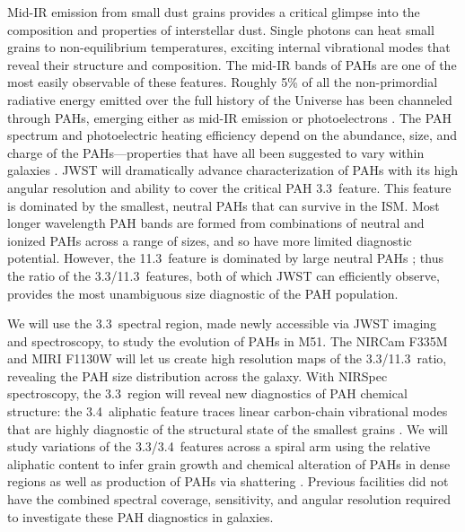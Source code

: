 \documentclass[12pt]{article}
\begin{document}
\vspace{0.2\baselineskip}
 Mid-IR emission from small dust grains provides a critical glimpse into the composition and properties of interstellar dust. Single photons can heat small grains to non-equilibrium temperatures, exciting internal vibrational modes that reveal their structure and composition. The mid-IR bands of PAHs are one of the most easily observable of these features. Roughly 5\% of all the non-primordial radiative energy emitted over the full history of the Universe has been channeled through PAHs, emerging either as mid-IR emission or photoelectrons \citep{dole2006,smith2007}. The PAH spectrum and photoelectric heating efficiency depend on the abundance, size, and charge of the PAHs---properties that have all been suggested to vary within galaxies \citep{bakes1994,weingartner2001,croxall2012}. JWST will dramatically advance characterization of PAHs with its high angular resolution and ability to cover the critical PAH 3.3\micron\ feature. This feature is dominated by the smallest, neutral PAHs that can survive in the ISM. Most longer wavelength PAH bands are formed from combinations of neutral and ionized PAHs across a range of sizes, and so have more limited diagnostic potential. However, the 11.3\micron\ feature is dominated by large neutral PAHs \citep{bauschlicher2008}; thus the ratio of the 3.3/11.3\micron\ features, both of which JWST can efficiently observe, provides the most unambiguous size diagnostic of the PAH population.

We will use the 3.3\micron\ spectral region, made newly accessible via JWST imaging and spectroscopy, to study the evolution of PAHs in M51. The NIRCam F335M and MIRI F1130W will let us create high resolution maps of the 3.3/11.3\micron\ ratio, revealing the PAH size distribution across the galaxy. With NIRSpec spectroscopy, the 3.3\micron\ region will reveal new diagnostics of PAH chemical structure: the 3.4\micron\ aliphatic feature traces linear carbon-chain vibrational modes that are highly diagnostic of the structural state of the smallest grains \citep{joblin1996}.  We will study variations of the 3.3/3.4\micron\ features across a spiral arm using the relative aliphatic content to infer grain growth and chemical alteration of PAHs in dense regions \citep[e.g.,][]{berne2009} as well as production of PAHs via shattering \citep{yamagishi2012}.  Previous facilities did not have the combined spectral coverage, sensitivity, and angular resolution required to investigate these PAH diagnostics in galaxies. 
\end{document}
